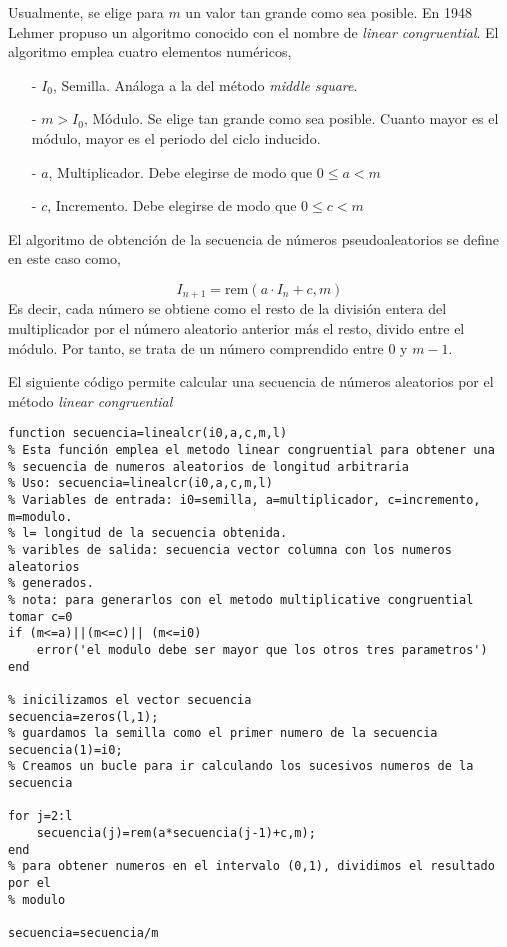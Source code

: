 Usualmente, se elige para $m$ un valor tan grande como sea posible. 
En 1948 Lehmer propuso un algoritmo conocido con el nombre de \emph{linear congruential}. El algoritmo emplea cuatro elementos numéricos,

\begin{itemize}
\item[-] $I_0$, Semilla. Análoga a la del método \emph{middle square}.
\item[-] $m > I_0$, Módulo.  Se elige tan grande como sea posible. Cuanto mayor es el módulo, mayor es el periodo del ciclo inducido.
\item[-] $a$, Multiplicador. Debe elegirse de modo que $0\le a < m$
\item[-] $c$, Incremento. Debe elegirse de modo que $0\le c < m$
\end{itemize}
 
El algoritmo de obtención de la secuencia de números pseudoaleatorios se define en este caso como,

\begin{equation*}
I_{n+1}=\text{rem}(a\cdot I_n+c, m)
\end{equation*}
Es decir, cada número se obtiene como el resto de la división entera del multiplicador por el número aleatorio anterior más el resto, divido entre el módulo. Por tanto, se trata de un número comprendido entre $0$ y $m-1$. 

El siguiente código permite calcular una secuencia de números aleatorios por el método \emph{linear congruential}

\begin{lstlisting}
function secuencia=linealcr(i0,a,c,m,l)
% Esta función emplea el metodo linear congruential para obtener una
% secuencia de numeros aleatorios de longitud arbitraria
% Uso: secuencia=linealcr(i0,a,c,m,l)
% Variables de entrada: i0=semilla, a=multiplicador, c=incremento, m=modulo.
% l= longitud de la secuencia obtenida.
% varibles de salida: secuencia vector columna con los numeros aleatorios
% generados.
% nota: para generarlos con el metodo multiplicative congruential tomar c=0
if (m<=a)||(m<=c)|| (m<=i0)
    error('el modulo debe ser mayor que los otros tres parametros')
end

% inicilizamos el vector secuencia
secuencia=zeros(l,1);
% guardamos la semilla como el primer numero de la secuencia
secuencia(1)=i0;
% Creamos un bucle para ir calculando los sucesivos numeros de la secuencia

for j=2:l
    secuencia(j)=rem(a*secuencia(j-1)+c,m);
end
% para obtener numeros en el intervalo (0,1), dividimos el resultado por el
% modulo

secuencia=secuencia/m
\end{lstlisting}


